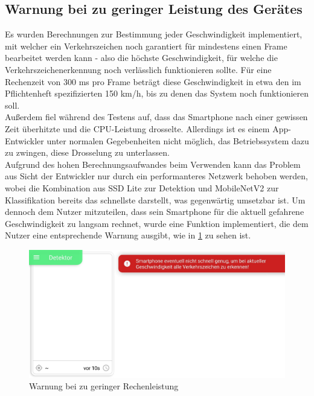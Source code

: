 \documentclass[12pt,a4paper,ngerman,enabledeprecatedfontcommands]{scrreprt}
\begin{document}
\subsection{Warnung bei zu geringer Leistung des Gerätes}
Es wurden Berechnungen zur Bestimmung jeder Geschwindigkeit implementiert, mit welcher ein Verkehrszeichen noch garantiert für mindestens einen Frame bearbeitet werden kann - also die höchste Geschwindigkeit, für welche die Verkehrszeichenerkennung noch verlässlich funktionieren sollte. Für eine Rechenzeit von 300 ms pro Frame beträgt diese Geschwindigkeit in etwa den im Pflichtenheft spezifizierten 150 km/h, bis zu denen das \gls{System} noch funktionieren soll.\\
Außerdem fiel während des Testens auf, dass das \gls{Smartphone} nach einer gewissen Zeit über\-hitzte und die \gls{CPU}-Leistung drosselte. Allerdings ist es einem \gls{App}-Entwickler unter normalen Gegebenheiten nicht möglich, das Betriebssystem dazu zu zwingen, diese Drosselung zu unterlassen.\\
Aufgrund des hohen Berechnungsaufwandes beim Verwenden  kann das Problem aus Sicht der Entwickler nur durch ein performanteres Netzwerk behoben werden, wobei die Kombination aus SSD Lite zur \gls{Detektion} und MobileNetV2 zur \gls{Klassifikation} bereits das schnellste darstellt, was gegenwärtig umsetzbar ist. Um dennoch dem \gls{Nutzer} mitzuteilen, dass sein \gls{Smartphone} für die aktuell gefahrene Geschwindigkeit zu langsam rechnet, wurde eine Funktion implementiert, die dem Nutzer eine entsprechende Warnung ausgibt, wie in \cref{fig:smartphone_zu_langsam} zu sehen ist.\\

\begin{figure}[H]
\centering
\includegraphics[width=0.9\linewidth]{Reviewdokument/Grafiken/smartphone_zu_langsam.jpeg}
\caption{Warnung bei zu geringer Rechenleistung}
\label{fig:smartphone_zu_langsam}
\end{figure}
\smallskip
\end{document}
